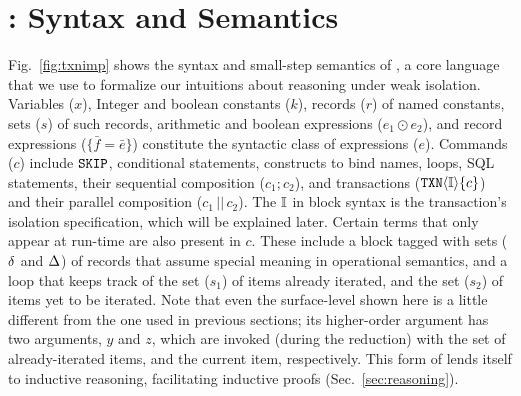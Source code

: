 \section{\txnimp: Syntax and Semantics}
\label{sec:opsem}

\label{sec:syntax}



Fig.~\ref{fig:txnimp} shows the syntax and small-step semantics of
\txnimp, a core language that we use to formalize our intuitions about
reasoning under weak isolation. Variables ($x$), Integer and boolean
constants ($k$), records ($r$) of named constants, sets ($s$) of such
records, arithmetic and boolean expressions ($e_1 \odot e_2$), and
record expressions ($\{\bar{f}=\bar{e}\}$) constitute the syntactic
class of expressions ($e$). Commands ($c$) include $\cskip$,
conditional statements,  constructs to bind names, 
loops, SQL statements, their sequential composition ($c_1;c_2$), and
transactions ($\ctxn{i}{\I}{c}$) and their parallel composition
($c_1\,||\,c_2$). The $\I$ in  block syntax is the
transaction's isolation specification, which will be explained later.
Certain terms that only appear at run-time are also present in $c$.
These include a  block tagged with sets ($\stl$ and $\stg$) of
records that assume special meaning in operational semantics, and a
 loop that keeps track of the set ($s_1$) of items already
iterated, and the set ($s_2$) of items yet to be iterated. Note that
even the surface-level  shown here is a little different
from the one used in previous sections; its higher-order argument has
two arguments, $y$ and $z$, which are invoked (during the reduction)
with the set of already-iterated items, and the current item,
respectively. This form of  lends itself to inductive
reasoning, facilitating inductive proofs (Sec.~\ref{sec:reasoning}).


